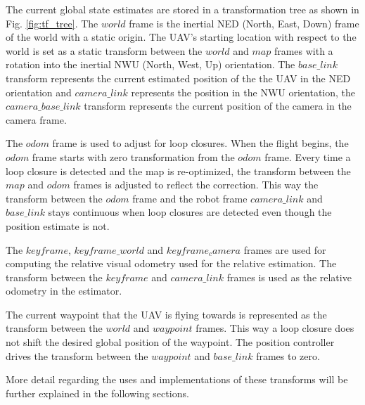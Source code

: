 \documentclass[letterpaper, 10 pt, conference]{ieeeconf}  %
\begin{document}
The current global state estimates are stored in a transformation tree as shown in Fig. \ref{fig:tf_tree}. The $\mathit{world}$ frame is the inertial NED (North, East, Down) frame of the world with a static origin. The UAV's starting location with respect to the world is set as a static transform between the $\mathit{world}$ and $\mathit{map}$ frames with a rotation into the inertial NWU (North, West, Up) orientation. The $\mathit{base\_link}$ transform represents the current estimated position of the the UAV in the NED orientation and $\mathit{camera\_link}$ represents the position in the NWU orientation, the $\mathit{camera\_base\_link}$ transform represents the current position of the camera in the camera frame.

The $\mathit{odom}$ frame is used to adjust for loop closures. When the flight begins, the $\mathit{odom}$ frame starts with zero transformation from the $\mathit{odom}$ frame. Every time a loop closure is detected and the map is re-optimized, the transform between the $\mathit{map}$ and $\mathit{odom}$ frames is adjusted to reflect the correction. This way the transform between the $\mathit{odom}$ frame and the robot frame $\mathit{camera\_link}$ and $\mathit{base\_link}$ stays continuous when loop closures are detected even though the position estimate is not.

The $\mathit{keyframe}$, $\mathit{keyframe\_world}$ and $\mathit{keyframe_camera}$ frames are used for computing the relative visual odometry used for the relative estimation. The transform between the $\mathit{keyframe}$ and $\mathit{camera\_link}$ frames is used as the relative odometry in the estimator.

The current waypoint that the UAV is flying towards is represented as the transform between the $\mathit{world}$ and $\mathit{waypoint}$ frames. This way a loop closure does not shift the desired global position of the waypoint. The position controller drives the transform between the $\mathit{waypoint}$ and $\mathit{base\_link}$ frames to zero.

More detail regarding the uses and implementations of these transforms will be further explained in the following sections.

\end{document}
